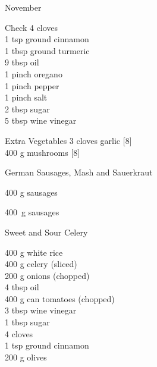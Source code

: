 \begin{menu}{November}
\begin{shoppinglist}{Check}
      4  cloves \\
      1 tsp ground cinnamon \\
      1 tbsp ground turmeric \\
      9 tbsp oil \\
      1 pinch oregano \\
      1 pinch pepper \\
      1 pinch salt \\
      2 tbsp sugar \\
      5 tbsp wine vinegar \\
      \end{shoppinglist}%
      \begin{shoppinglist}{Extra Vegetables}
      3 cloves garlic {\scriptsize[8]}\\
      400 g mushrooms {\scriptsize[8]}\\
      \end{shoppinglist}%
      \par\vfil %
    \vfil\clearpage
  
    \begin{recipe}{2}{German Sausages, Mash and Sauerkraut}%
		\begin{ingredients}
		400 g sausages  \\
	
		\end{ingredients}
	
    \begin{instructions}
    \item 400~g  sausages
    \end{instructions}
    \end{recipe}%
  
    \begin{recipe}{2}{Sweet and Sour Celery}%
		\begin{ingredients}
		400 g white rice  \\
	400 g celery (sliced) \\
	200 g onions (chopped) \\
	4 tbsp oil  \\
	400 g can tomatoes (chopped) \\
	3 tbsp wine vinegar  \\
	1 tbsp sugar  \\
	4  cloves  \\
	1 tsp ground cinnamon  \\
	200 g olives  \\
	

\end{ingredients}
\end{recipe}
\end{menu}
